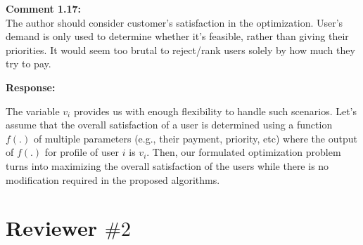 \documentclass[11pt]{article}
\begin{document}
\vspace{5mm}
{
{\color{blue}\noindent\textbf{Comment 1.17:}\\
The author should consider customer’s satisfaction in the optimization. User’s demand is only used to determine whether it’s feasible, rather than giving their priorities. It would seem too brutal to reject/rank users solely by how much they try to pay.
}}

\vspace{5mm}
\noindent\textbf{Response:}

The variable $v_i$ provides us with enough flexibility to handle such scenarios. 
Let's assume that the overall satisfaction of a user is determined using a function $f(.)$ of multiple parameters (e.g., their payment, priority, etc) where the output of $f(.)$ for profile of user $i$ is $v_i$. Then, our formulated optimization problem turns into maximizing the overall satisfaction of the users while there is no modification required in the proposed algorithms. 


\newpage
\section{Reviewer $\# 2$}
{\color{blue}}
%

\end{document}

